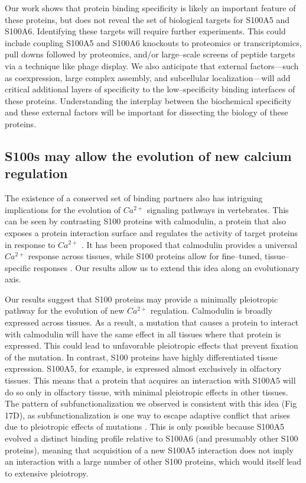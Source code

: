 Our work shows that protein binding specificity is likely an important
feature of these proteins, but does not reveal the set of biological
targets for S100A5 and S100A6. Identifying these targets will require
further experiments. This could include coupling S100A5 and S100A6
knockouts to proteomics or transcriptomics, pull downs followed by
proteomics, and/or large--scale screens of peptide targets via a technique
like phage display. We also anticipate that external factors---such
as coexpression, large complex assembly, and subcellular localization---will
add critical additional layers of specificity to the low--specificity
binding interfaces of these proteins. Understanding the interplay
between the biochemical specificity and these external factors will
be important for dissecting the biology of these proteins. 

\subsection{S100s may allow the evolution of new calcium regulation}

The existence of a conserved set of binding partners also has intriguing
implications for the evolution of $Ca^{2+}$ signaling pathways in
vertebrates. This can be seen by contrasting S100 proteins with calmodulin,
a protein that also exposes a protein interaction surface and regulates
the activity of target proteins in response to $Ca^{2+}$ \citep{chin_calmodulin:_2000}.
It has been proposed that calmodulin provides a universal $Ca^{2+}$
response across tissues, while S100 proteins allow for fine--tuned,
tissue--specific responses \citep{marenholz_s100_2004,donato_functions_2013}.
Our results allow us to extend this idea along an evolutionary axis. 

Our results suggest that S100 proteins may provide a minimally pleiotropic
pathway for the evolution of new $Ca^{2+}$ regulation. Calmodulin
is broadly expressed across tissues. As a result, a mutation that
causes a protein to interact with calmodulin will have the same effect
in all tissues where that protein is expressed. This could lead to
unfavorable pleiotropic effects that prevent fixation of the mutation.
In contrast, S100 proteins have highly differentiated tissue expression.
S100A5, for example, is expressed almost exclusively in olfactory
tissues. This means that a protein that acquires an interaction with
S100A5 will do so only in olfactory tissue, with minimal pleiotropic
effects in other tissues. The pattern of subfunctionalization we observed
is consistent with this idea (Fig 17D), as subfunctionalization is
one way to escape adaptive conflict that arises due to pleiotropic
effects of mutations \citep{des_marais_escape_2008,soskine_mutational_2010}.
This is only possible because S100A5 evolved a distinct binding profile
relative to S100A6 (and presumably other S100 proteins), meaning that
acquisition of a new S100A5 interaction does not imply an interaction
with a large number of other S100 proteins, which would itself lead
to extensive pleiotropy. 

